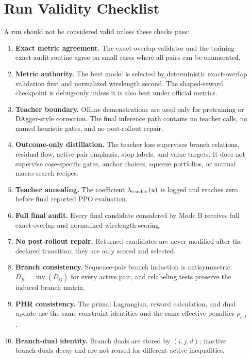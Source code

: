 \documentclass[11pt]{article}
\begin{document}
\section{Run Validity Checklist}

A run should not be considered valid unless these checks pass:
\begin{enumerate}
    \item \textbf{Exact metric agreement.} The exact-overlap validator and the training exact-audit routine agree on small cases where all pairs can be enumerated.
    \item \textbf{Metric authority.} The best model is selected by deterministic exact-overlap validation first and normalized wirelength second. The shaped-reward checkpoint is debug-only unless it is also best under official metrics.
    \item \textbf{Teacher boundary.} Offline demonstrations are used only for pretraining or DAgger-style correction. The final inference path contains no teacher calls, no named heuristic gates, and no post-rollout repair.
    \item \textbf{Outcome-only distillation.} The teacher loss supervises branch relations, residual flow, active-pair emphasis, stop labels, and value targets. It does not supervise case-specific gates, anchor choices, squeeze portfolios, or manual macro-search recipes.
    \item \textbf{Teacher annealing.} The coefficient $\lambda_{\rm teacher}(u)$ is logged and reaches zero before final reported PPO evaluation.
    \item \textbf{Full final audit.} Every final candidate considered by Mode B receives full exact-overlap and normalized-wirelength scoring.
    \item \textbf{No post-rollout repair.} Returned candidates are never modified after the declared transition; they are only scored and selected.
    \item \textbf{Branch consistency.} Sequence-pair branch induction is antisymmetric: $D_{ji}=\operatorname{inv}(D_{ij})$ for every active pair, and relabeling tests preserve the induced branch matrix.
    \item \textbf{PHR consistency.} The primal Lagrangian, reward calculation, and dual update use the same constraint identities and the same effective penalties $\rho_{e,t}$.
    \item \textbf{Branch-dual identity.} Branch duals are stored by $(i,j,d)$; inactive branch duals decay and are not reused for different active inequalities.

\end{enumerate}
\end{document}
